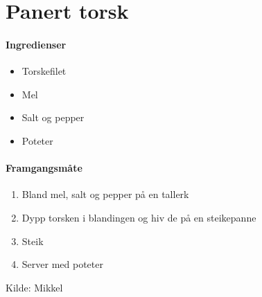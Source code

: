 \section{Panert torsk}


\paragraph{Ingredienser}
\begin{itemize}[noitemsep]
	\item Torskefilet
	\item Mel
	\item Salt og pepper
	\item Poteter
\end{itemize}

\paragraph{Framgangsmåte}
\begin{enumerate}[noitemsep]
	\item Bland mel, salt og pepper på en tallerk
	\item Dypp torsken i blandingen og hiv de på en steikepanne
	\item Steik
	\item Server med poteter
\end{enumerate}


Kilde: Mikkel
